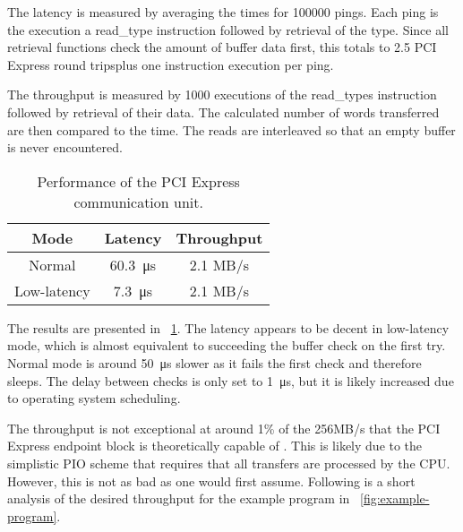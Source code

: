 
The latency is measured by averaging the times for 100000 pings.
Each ping is the execution a read\_type instruction followed by retrieval of the type.
Since all retrieval functions check the amount of buffer data first, this totals to 2.5 PCI Express round trips\footnotemark plus one instruction execution per ping.


The throughput is measured by 1000 executions of the read\_types instruction followed by retrieval of their data.
The calculated number of words transferred are then compared to the time.
The reads are interleaved so that an empty buffer is never encountered.

\begin{table}[!ht]
    \renewcommand{\arraystretch}{1.4}
    \centering
    \begin{tabular}{c|c|c}
        \bfseries Mode & \bfseries Latency & \bfseries Throughput \\
        \hline
        Normal & \SI{60.3}{\micro\second} & 2.1 MB/s \\
        Low-latency & \SI{7.3}{\micro\second} & 2.1 MB/s \\
    \end{tabular}
    \caption[Communication performance]{
        Performance of the PCI Express communication unit.
    }
    \label{tab:communication-performance}
\end{table}

The results are presented in \tablename~\ref{tab:communication-performance}.
The latency appears to be decent in low-latency mode, which is almost equivalent to succeeding the buffer check on the first try.
Normal mode is around \SI{50}{\micro\second} slower as it fails the first check and therefore sleeps.
The delay between checks is only set to \SI{1}{\micro\second}, but it is likely increased due to operating system scheduling.

The throughput is not exceptional at around 1\% of the 256MB/s that the PCI Express endpoint block is theoretically capable of \cite{ug672}.
This is likely due to the simplistic PIO scheme that requires that all transfers are processed by the CPU.
However, this is not as bad as one would first assume.
Following is a short analysis of the desired throughput for the example program in \figurename~\ref{fig:example-program}.

